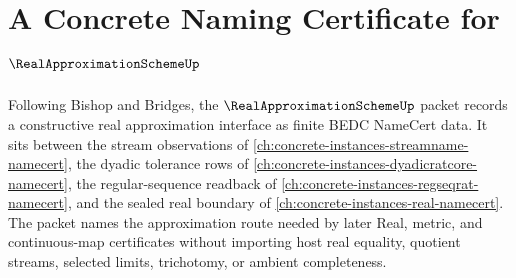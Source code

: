 \chapter{A Concrete Naming Certificate for $\RealApproximationSchemeUp$}
\label{ch:concrete-instances-real-approximation-scheme-namecert}

Following Bishop and Bridges, the $\RealApproximationSchemeUp$ packet records a constructive real approximation interface as finite BEDC NameCert data. It sits between the stream observations of \autoref{ch:concrete-instances-streamname-namecert}, the dyadic tolerance rows of \autoref{ch:concrete-instances-dyadicratcore-namecert}, the regular-sequence readback of \autoref{ch:concrete-instances-regseqrat-namecert}, and the sealed real boundary of \autoref{ch:concrete-instances-real-namecert}. The packet names the approximation route needed by later Real, metric, and continuous-map certificates without importing host real equality, quotient streams, selected limits, trichotomy, or ambient completeness.

